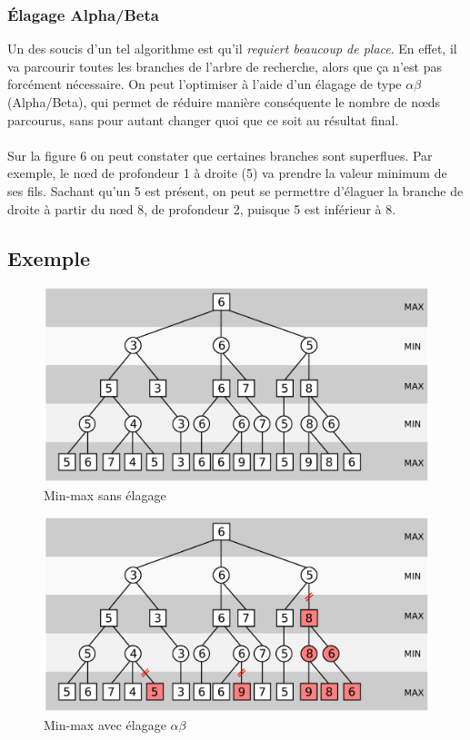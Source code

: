 \documentclass[a4paper,12pt]{article}
\begin{document}
\subsubsection{Élagage Alpha/Beta}
Un des soucis d'un tel algorithme est qu'il \emph{requiert beaucoup de place}. En effet, il va parcourir toutes les branches de l'arbre de recherche, alors que ça n'est pas forcément nécessaire. On peut l'optimiser à l'aide d'un élagage de type $\alpha\beta$ (Alpha/Beta), qui permet de réduire manière conséquente le nombre de n\oe{}ds parcourus, sans pour autant changer quoi que ce soit au résultat final.
\\\\
Sur la figure 6 on peut constater que certaines branches sont superflues. Par exemple, le n\oe{}d de profondeur 1 à droite (5) va prendre la valeur minimum de ses fils. Sachant qu'un 5 est présent, on peut se permettre d'élaguer la branche de droite à partir du n\oe{}d 8, de profondeur 2, puisque 5 est inférieur à 8.

\subsection{Exemple}
\begin{figure}[H]
    \centering
    \includegraphics[width=.8\textwidth]{./pix/minimax}
    \caption{Min-max sans élagage}
\end{figure}

\begin{figure}[H]
    \centering
    \includegraphics[width=.8\textwidth]{./pix/alphabeta}
    \caption{Min-max avec élagage $\alpha\beta$}
\end{figure}
\newpage
\end{document}
